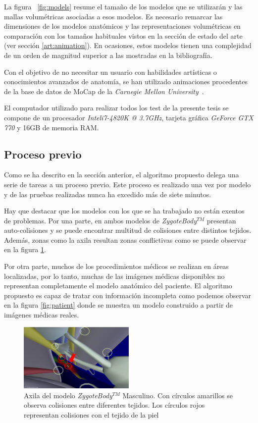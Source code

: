 La figura ~\ref{fig:models} resume el tamaño de los modelos que se utilizarán y las mallas volumétricas asociadas a esos modelos. Es necesario remarcar las dimensiones de los modelos anatómicos y las representaciones volumétricas en comparación con los tamaños habituales vistos en la sección de estado del arte (ver sección \ref{art:animation}). En ocasiones, estos modelos tienen una complejidad de un orden de magnitud superior a las mostradas en la bibliografía.

Con el objetivo de no necesitar un usuario con habilidades artísticas o conocimientos avanzados de anatomía, se han utilizado animaciones procedentes de la base de datos de \ac{MoCap} de la \emph{Carnegie Mellon University}~\cite{CMUMCD}.

El computador utilizado para realizar todos los test de la presente tesis se compone de un procesador \emph{Intel\textregistered i7-4820K @ 3.7GHz}, tarjeta gráfica \emph{GeForce GTX 770} y 16GB de memoria \acs{RAM}.


\subsection{Proceso previo}
Como se ha descrito en la sección anterior, el algoritmo propuesto delega una serie de tareas a un proceso previo. Este proceso es realizado una vez por modelo y de las pruebas realizadas nunca ha excedido más de siete minutos. 


Hay que destacar que los modelos con los que se ha trabajado no están exentos de problemas. Por una parte, en ambos modelos de \emph{ZygoteBody}$^{TM}$ presentan auto-colisiones y se puede encontrar multitud de colisiones entre distintos tejidos. Además, zonas como la axila resultan zonas conflictivas como se puede observar en la figura \ref{fig:zygoteproblems}. 

Por otra parte, muchos de los procedimientos médicos se realizan en áreas localizadas, por lo tanto, muchas de las imágenes médicas disponibles no representan completamente el modelo anatómico del paciente. El algoritmo propuesto es capaz de tratar con información incompleta como podemos observar en la figura \ref{fig:patient} donde se muestra un modelo construido a partir de imágenes médicas reales.

\begin{figure}[h]
   \centering
    \includegraphics[width=0.5\textwidth]{IMG/zygoteproblems.png}
    \caption{Axila del modelo \emph{ZygoteBody}$^{TM}$ Masculino. Con círculos amarillos se observa colisiones entre diferentes tejidos. Los círculos rojos representan colisiones con el tejido de la piel  }
   \label{fig:zygoteproblems}
\end{figure}


